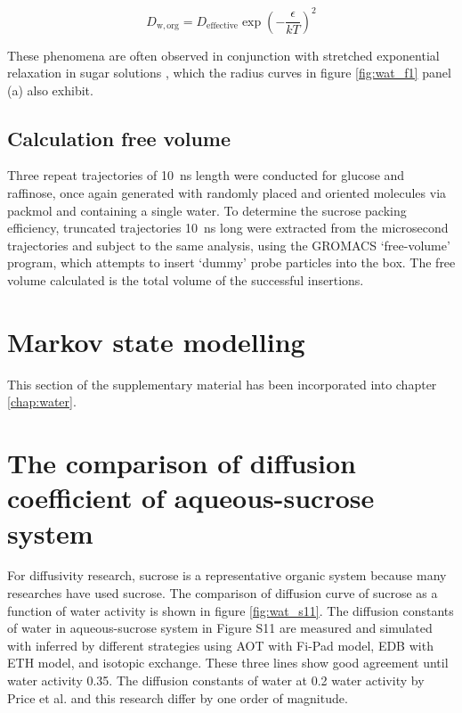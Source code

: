 \begin{equation}
D_{\mathrm{w, org}}=D_{\mathrm{effective}} \exp \left(-\frac{\epsilon}{k T}\right)^{2}
\end{equation}

These  phenomena  are  often  observed  in  conjunction  with stretched  exponential  relaxation  in  sugar solutions \cite{mesteGlassTransitionFood2002,Liu2006}, which the radius curves in figure \ref{fig:wat_f1} panel (a) also exhibit. 

\subsection{Calculation free volume}
Three repeat trajectories of \SI{10}{\nano\second} length were conducted for glucose and raffinose, once again generated with randomly placed and oriented molecules via packmol and containing a single water. To determine the sucrose packing efficiency, truncated trajectories \SI{10}{\nano\second} long were extracted from the microsecond trajectories and subject to the same analysis, using the GROMACS `free-volume’ program, which attempts to insert `dummy’ probe particles into the box. The free volume calculated is the total volume of the successful insertions.

\section{Markov state modelling}

This section of the supplementary material has been incorporated into chapter \ref{chap:water}. 
\section{The comparison of diffusion coefficient of aqueous-sucrose system}

For diffusivity research, sucrose is a representative organic system because many researches have used sucrose. The comparison of diffusion curve of sucrose as a function of water activity is shown in figure \ref{fig:wat_s11}. The diffusion constants of water in aqueous-sucrose system in Figure S11 are measured and simulated with inferred by different strategies using AOT with Fi-Pad model, EDB with ETH model, and isotopic exchange. These three lines show good agreement until water activity \num{0.35}. The diffusion constants of water at \num{0.2} water activity by Price et al. \cite{Price2014} and this research differ by one order of magnitude. 

